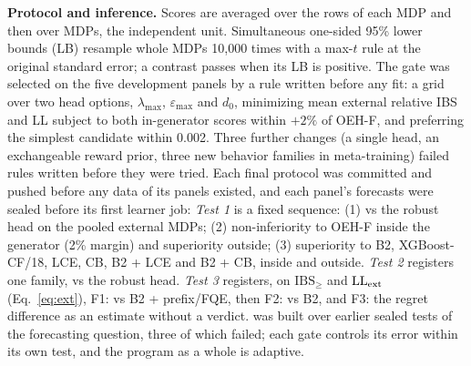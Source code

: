 \textbf{Protocol and inference.} Scores are averaged over the rows of each MDP and then over MDPs, the independent unit. Simultaneous one-sided 95\% lower bounds (LB) resample whole MDPs 10{,}000 times with a max-$t$ rule at the original standard error; a contrast passes when its LB is positive. The gate was selected on the five development panels by a rule written before any fit: a grid over two head options, $\lambda_{\max}$, $\varepsilon_{\max}$ and $d_0$, minimizing mean external relative IBS and LL subject to both in-generator scores within $+2\%$ of OEH-F, and preferring the simplest candidate within 0.002. Three further changes (a single head, an exchangeable reward prior, three new behavior families in meta-training) failed rules written before they were tried. Each final protocol was committed and pushed before any data of its panels existed, and each panel's forecasts were sealed before its first learner job:
\emph{Test 1} is a fixed sequence: (1) \OEH{} vs the robust head on the pooled external MDPs; (2) non-inferiority to OEH-F inside the generator (2\% margin) and superiority outside; (3) superiority to B2, XGBoost-CF/18, LCE, CB, B2 + LCE and B2 + CB, inside and outside.
\emph{Test 2} registers one family, \OEH{} vs the robust head.
\emph{Test 3} registers, on $\mathrm{IBS}_\ge$ and $\mathrm{LL}_{\rm ext}$ (Eq.~\eqref{eq:ext}), F1: \OEH{} vs B2 + prefix/FQE, then F2: vs B2, and F3: the regret difference as an estimate without a verdict.
\OEH{} was built over earlier sealed tests of the forecasting question, three of which failed; each gate controls its error within its own test, and the program as a whole is adaptive.
